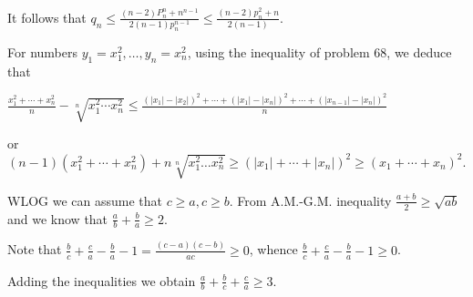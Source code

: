   It follows that $q_n\leq \frac{(n - 2)P_n^n + n^{n - 1}}{2(n - 1)p_n^{n - 1}}\leq \frac{(n - 2)p_n^2 +
    n}{2(n - 1)}$.
\item For numbers $y_1 = x_1^2, \ldots, y_n = x_n^2$, using the inequality of problem $68$, we deduce that

  $\frac{x_1^2 + \cdots + x_n^2}{n} - \sqrt[n]{x_1^2\cdots x_n^2}\leq \frac{(|x_1| - |x_2|)^2 + \cdots +
  (|x_1| - |x_n|)^2 + \cdots + (|x_{n - 1}| - |x_n|)^2}{n}$

  or $(n - 1)(x_1^2 + \cdots + x_n^2) + n\sqrt[n]{x_1^2\ldots x_n^2}\geq (|x_1| + \cdots + |x_n|)^2\geq (x_1
  + \cdots + x_n)^2$.
\item WLOG we can assume that $c\geq a, c\geq b$. From A.M.-G.M. inequality $\frac{a + b}{2}\geq \sqrt{ab}$
  and we know that $\frac{a}{b} + \frac{b}{a}\geq 2$.

  Note that $\frac{b}{c} + \frac{c}{a} - \frac{b}{a} - 1 = \frac{(c - a)(c - b)}{ac}\geq 0$, whence
  $\frac{b}{c} + \frac{c}{a} - \frac{b}{a} -1\geq 0$.

  Adding the inequalities we obtain $\frac{a}{b} + \frac{b}{c} + \frac{c}{a}\geq 3$.
\stopitemize
